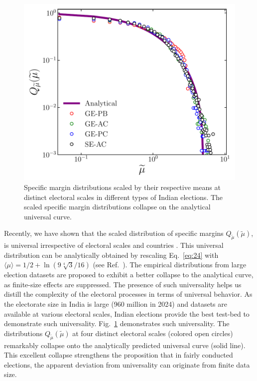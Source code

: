 \documentclass[reprint, pre, twocolumn, aps, showpacs, superscriptaddress]{revtex4-2}
\begin{document}
\begin{figure}[t]
    \centering
    \includegraphics[width=1\linewidth]{fig_4.pdf}
    \caption{Specific margin distributions scaled by their respective means at distinct electoral scales in different types of Indian elections. The scaled specific margin distributions collapse on the analytical universal curve.}
    \label{fig:4}
\end{figure}

Recently, we have shown that the scaled distribution of specific margins $Q_{\widetilde{\mu}}(\widetilde{\mu})$, is universal irrespective of electoral scales and countries \cite{pal2024universal}. This universal distribution can be analytically obtained by rescaling Eq.~\ref{eq:24} with $\langle \mu \rangle = {1} / {2}+\ln \left({9 \sqrt[4]{3}} / {16}\right)$ (see Ref.~\cite{supp}). The empirical distributions from large election datasets are proposed to exhibit a better collapse to the analytical curve, as finite-size effects are suppressed. The presence of such universality helps us distill the complexity of the electoral processes in terms of universal behavior. As the electorate size in India is large (960 million in 2024) and datasets are available at various electoral scales, Indian elections provide the best test-bed to demonstrate such universality. Fig.~\ref{fig:4} demonstrates such universality. The distributions $Q_{\widetilde{\mu}}(\widetilde{\mu})$ at four distinct electoral scales (colored open circles) remarkably collapse onto the analytically predicted universal curve (solid line). This excellent collapse strengthens the proposition that in fairly conducted elections, the apparent deviation from universality can originate from finite data size.
\end{document}
